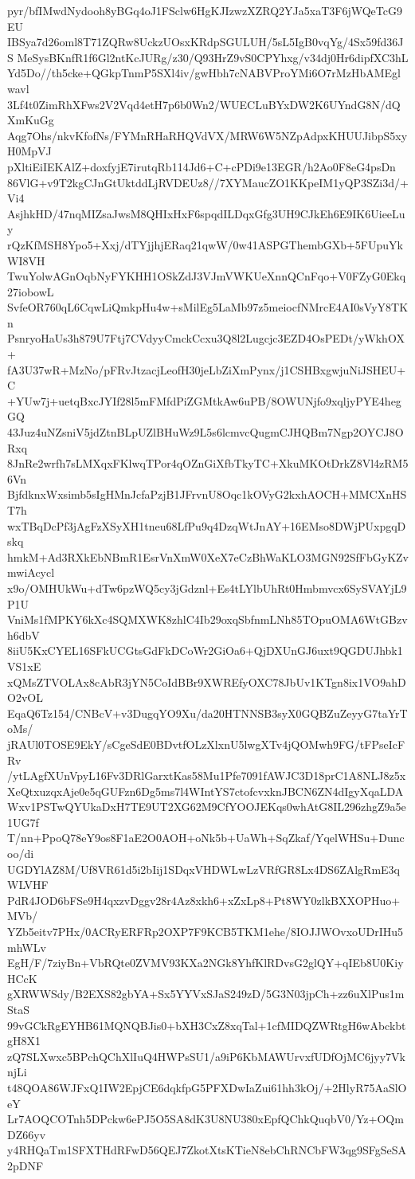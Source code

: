pyr/bfIMwdNydooh8yBGq4oJ1FSclw6HgKJIzwzXZRQ2YJa5xaT3F6jWQeTcG9EU
IBSya7d26oml8T71ZQRw8UckzUOsxKRdpSGULUH/5sL5IgB0vqYg/4Sx59fd36JS
MeSysBKnfR1f6Gl2ntKcJURg/z30/Q93HrZ9vS0CPYhxg/v34dj0Hr6dipfXC3hL
Yd5Do//th5cke+QGkpTnmP5SXl4iv/gwHbh7cNABVProYMi6O7rMzHbAMEglwavl
3Lf4t0ZimRhXFws2V2Vqd4etH7p6b0Wn2/WUECLuBYxDW2K6UYndG8N/dQXmKuGg
Aqg7Ohs/nkvKfofNs/FYMnRHaRHQVdVX/MRW6W5NZpAdpxKHUUJibpS5xyH0MpVJ
pXltiEiIEKAlZ+doxfyjE7irutqRb114Jd6+C+cPDi9e13EGR/h2Ao0F8eG4psDn
86VlG+v9T2kgCJnGtUktddLjRVDEUz8//7XYMaucZO1KKpeIM1yQP3SZi3d/+Vi4
AsjhkHD/47nqMIZsaJwsM8QHIxHxF6spqdILDqxGfg3UH9CJkEh6E9IK6UieeLuy
rQzKfMSH8Ypo5+Xxj/dTYjjhjERaq21qwW/0w41ASPGThembGXb+5FUpuYkWI8VH
TwuYolwAGnOqbNyFYKHH1OSkZdJ3VJmVWKUeXnnQCnFqo+V0FZyG0Ekq27iobowL
SvfeOR760qL6CqwLiQmkpHu4w+sMilEg5LaMb97z5meiocfNMrcE4AI0sVyY8TKn
PsnryoHaUs3h879U7Ftj7CVdyyCmckCcxu3Q8l2Lugcjc3EZD4OsPEDt/yWkhOX+
fA3U37wR+MzNo/pFRvJtzacjLeofH30jeLbZiXmPynx/j1CSHBxgwjuNiJSHEU+C
+YUw7j+uetqBxcJYIf28l5mFMfdPiZGMtkAw6uPB/8OWUNjfo9xqljyPYE4hegGQ
43Juz4uNZsniV5jdZtnBLpUZlBHuWz9L5s6lcmvcQugmCJHQBm7Ngp2OYCJ8ORxq
8JnRe2wrfh7sLMXqxFKlwqTPor4qOZnGiXfbTkyTC+XkuMKOtDrkZ8Vl4zRM56Vn
BjfdknxWxsimb5sIgHMnJcfaPzjB1JFrvnU8Oqc1kOVyG2kxhAOCH+MMCXnHST7h
wxTBqDcPf3jAgFzXSyXH1tneu68LfPu9q4DzqWtJnAY+16EMso8DWjPUxpgqDskq
hmkM+Ad3RXkEbNBmR1EsrVnXmW0XeX7eCzBhWaKLO3MGN92SfFbGyKZvmwiAcycl
x9o/OMHUkWu+dTw6pzWQ5cy3jGdznl+Es4tLYlbUhRt0Hmbmvcx6SySVAYjL9P1U
VniMs1fMPKY6kXc4SQMXWK8zhlC4Ib29oxqSbfnmLNh85TOpuOMA6WtGBzvh6dbV
8iiU5KxCYEL16SFkUCGtsGdFkDCoWr2GiOa6+QjDXUnGJ6uxt9QGDUJhbk1VS1xE
xQMsZTVOLAx8cAbR3jYN5CoIdBBr9XWREfyOXC78JbUv1KTgn8ix1VO9ahDO2vOL
EqaQ6Tz154/CNBcV+v3DugqYO9Xu/da20HTNNSB3syX0GQBZuZeyyG7taYrToMs/
jRAUl0TOSE9EkY/sCgeSdE0BDvtfOLzXlxnU5lwgXTv4jQOMwh9FG/tFPseIcFRv
/ytLAgfXUnVpyL16Fv3DRlGarxtKas58Mu1Pfe7091fAWJC3D18prC1A8NLJ8z5x
XeQtxuzqxAje0e5qGUFzn6Dg5ms7l4WIntYS7ctofcvxknJBCN6ZN4dIgyXqaLDA
Wxv1PSTwQYUkaDxH7TE9UT2XG62M9CfYOOJEKqs0whAtG8IL296zhgZ9a5e1UG7f
T/nn+PpoQ78eY9os8F1aE2O0AOH+oNk5b+UaWh+SqZkaf/YqelWHSu+Duncoo/di
UGDYlAZ8M/Uf8VR61d5i2bIij1SDqxVHDWLwLzVRfGR8Lx4DS6ZAlgRmE3qWLVHF
PdR4JOD6bFSe9H4qxzvDggv28r4Az8xkh6+xZxLp8+Pt8WY0zlkBXXOPHuo+MVb/
YZb5eitv7PHx/0ACRyERFRp2OXP7F9KCB5TKM1ehe/8IOJJWOvxoUDrIHu5mhWLv
EgH/F/7ziyBn+VbRQte0ZVMV93KXa2NGk8YhfKlRDvsG2glQY+qIEb8U0KiyHCcK
gXRWWSdy/B2EXS82gbYA+Sx5YYVxSJaS249zD/5G3N03jpCh+zz6uXlPus1mStaS
99vGCkRgEYHB61MQNQBJis0+bXH3CxZ8xqTal+1cfMIDQZWRtgH6wAbckbtgH8X1
zQ7SLXwxc5BPchQChXlIuQ4HWPsSU1/a9iP6KbMAWUrvxfUDfOjMC6jyy7VknjLi
t48QOA86WJFxQ1IW2EpjCE6dqkfpG5PFXDwIaZui61hh3kOj/+2HlyR75AaSlOeY
Lr7AOQCOTnh5DPckw6ePJ5O5SA8dK3U8NU380xEpfQChkQuqbV0/Yz+OQmDZ66yv
y4RHQaTm1SFXTHdRFwD56QEJ7ZkotXtsKTieN8ebChRNCbFW3qg9SFgSeSA2pDNF
